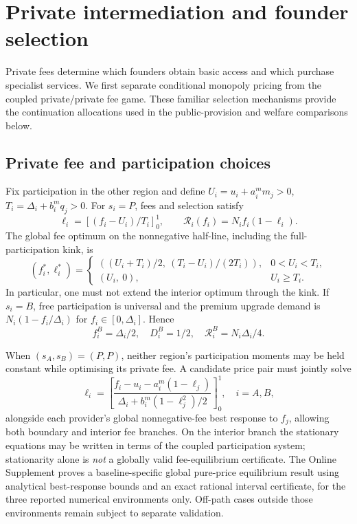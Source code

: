 \section{Private intermediation and founder selection}\label{sec:equilibrium}
Private fees determine which founders obtain basic access and which purchase specialist services. We first separate conditional monopoly pricing from the coupled private/private fee game. These familiar selection mechanisms provide the continuation allocations used in the public-provision and welfare comparisons below.

\subsection{Private fee and participation choices}
Fix participation in the other region and define $U_i=u_i+a_i^m m_j>0$, $T_i=\Delta_i+b_i^m q_j>0$. For $s_i=P$, fees and selection satisfy
\begin{equation}
 \ell_i=[(f_i-U_i)/T_i]_0^1,\qquad
 \mathcal R_i(f_i)=N_i f_i(1-\ell_i).
\end{equation}
The global fee optimum on the nonnegative half-line, including the full-participation kink, is
\begin{equation}
 (f_i^*,\ell_i^*)=
 \begin{cases}
 ((U_i+T_i)/2,\ (T_i-U_i)/(2T_i)),&0<U_i<T_i,\\[2mm]
 (U_i,\ 0),&U_i\geq T_i.
 \end{cases}\label{eq:monopolyfee}
\end{equation}
In particular, one must not extend the interior optimum through the kink. If $s_i=B$, free participation is universal and the premium upgrade demand is $N_i(1-f_i/\Delta_i)$ for $f_i\in[0,\Delta_i]$. Hence
\begin{equation}
 f_i^B=\Delta_i/2,\quad D_i^B=1/2,\quad
 \mathcal R_i^B=N_i\Delta_i/4.
 \label{eq:coexist}
\end{equation}

When $(s_A,s_B)=(P,P)$, neither region's participation moments may be held constant while optimising its private fee. A candidate price pair must jointly solve
\begin{equation}
 \ell_i=\left[\frac{f_i-u_i-a_i^m(1-\ell_j)}
 {\Delta_i+b_i^m(1-\ell_j^2)/2}\right]_0^1,\quad i=A,B,
 \label{eq:pp-fixedpoint}
\end{equation}
alongside each provider's global nonnegative-fee best response to $f_j$, allowing both boundary and interior fee branches. On the interior branch the stationary equations may be written in terms of the coupled participation system; stationarity alone is \emph{not} a globally valid fee-equilibrium certificate. The Online Supplement proves a baseline-specific global pure-price equilibrium result using analytical best-response bounds and an exact rational interval certificate, for the three reported numerical environments only. Off-path cases outside those environments remain subject to separate validation.

